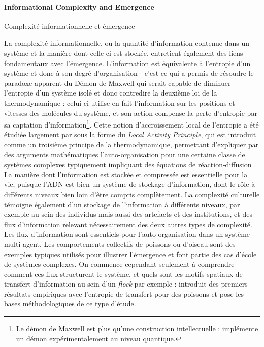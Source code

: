 



\paragraph{Informational Complexity and Emergence}{Complexité informationnelle et émergence}

La complexité informationnelle, ou la quantité d'information contenue dans un système et la manière dont celle-ci est stockée, entretient également des liens fondamentaux avec l'émergence. L'information est équivalente à l'entropie d'un système et donc à son degré d'organisation - c'est ce qui a permis de résoudre le paradoxe apparent du Démon de Maxwell qui serait capable de diminuer l'entropie d'un système isolé et donc contredire la deuxième loi de la thermodynamique : celui-ci utilise en fait l'information sur les positions et vitesses des molécules du système, et son action compense la perte d'entropie par sa captation d'information\footnote{Le démon de Maxwell est plus qu'une construction intellectuelle : \cite{cottet2017observing} implémente un démon expérimentalement au niveau quantique.}. Cette notion d'accroissement local de l'entropie a été étudiée largement par  sous la forme du \emph{Local Activity Principle}, qui est introduit comme un troisième principe de la thermodynamique, permettant d'expliquer par des arguments mathématiques l'auto-organisation pour une certaine classe de systèmes complexes typiquement impliquant des équations de réaction-diffusion~\cite{mainzer2013local}. La manière dont l'information est stockée et compressée est essentielle pour la vie, puisque l'ADN est bien un système de stockage d'information, dont le rôle à différents niveaux bien loin d'être compris complètement. La complexité culturelle témoigne également d'un stockage de l'information à différents niveaux, par exemple au sein des individus mais aussi des artefacts et des institutions, et des flux d'information relevant nécessairement des deux autres types de complexité. Les flux d'information sont essentiels pour l'auto-organisation dans un système multi-agent. Les comportements collectifs de poissons ou d'oiseau sont des exemples typiques utilisés pour illustrer l'émergence et font partie des cas d'école de systèmes complexes. On commence cependant seulement à comprendre comment ces flux structurent le système, et quels sont les motifs spatiaux de transfert d'information au sein d'un \emph{flock} par exemple : \cite{crosato2017informative} introduit des premiers résultats empiriques avec l'entropie de transfert pour des poissons et pose les bases méthodologiques de ce type d'étude.




